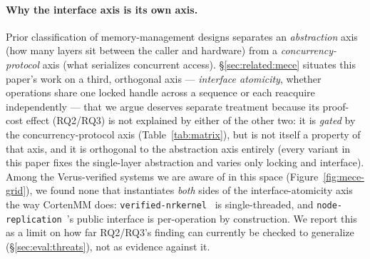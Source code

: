 \documentclass[10pt]{article}
\newcommand{\vfn}[1]{\texttt{#1}}
\begin{document}
\paragraph{Why the interface axis is its own axis.} Prior classification
of memory-management designs separates an \emph{abstraction} axis
(how many layers sit between the caller and hardware) from a
\emph{concurrency-protocol} axis (what serializes concurrent access).
\S\ref{sec:related:mece} situates this paper's work on a third,
orthogonal axis --- \emph{interface atomicity}, whether operations share
one locked handle across a sequence or each reacquire independently ---
that we argue deserves separate treatment because its proof-cost effect
(RQ2/RQ3) is not explained by either of the other two: it is
\emph{gated} by the concurrency-protocol axis (Table~\ref{tab:matrix}),
but is not itself a property of that axis, and it is orthogonal to the
abstraction axis entirely (every variant in this paper fixes the
single-layer abstraction and varies only locking and interface). Among
the Verus-verified systems we are aware of in this space
(Figure~\ref{fig:mece-grid}), we found none that instantiates
\emph{both} sides of the interface-atomicity axis the way CortenMM
does: \vfn{verified-nrkernel}~\cite{nrkernel} is single-threaded, and
\vfn{node-replication}~\cite{nr}'s public interface is
per-operation by construction. We report this as a limit on how far
RQ2/RQ3's finding can currently be checked to generalize
(\S\ref{sec:eval:threats}), not as evidence against it.
\end{document}
